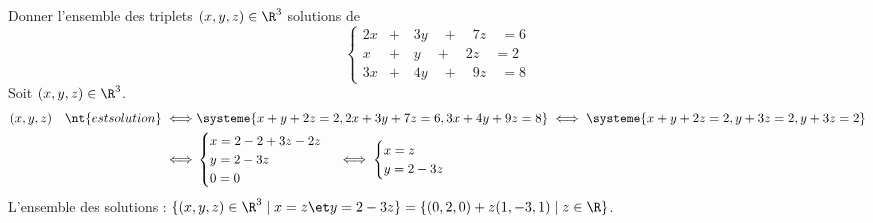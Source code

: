 \documentclass[11pt]{article}
\begin{document}
\begin{ex}{}{}
    Donner l'ensemble des triplets $(x,y,z)\in\R^3$ solutions de
    \begin{equation*}
        \begin{cases}
            2x&+\quad 3y\quad+\quad 7z\quad= 6\\
            x&+\quad y\quad+\quad 2z\quad= 2\\
            3x&+\quad 4y\quad+\quad 9z\quad= 8
        \end{cases}
    \end{equation*}
    \tcblower
    Soit $(x,y,z)\in\R^3$.
    \begin{align*}
        (x,y,z)\quad\nt{est solution} \iff& \systeme{
            x+y+2z=2,
            2x+3y+7z=6,
            3x+4y+9z=8
        } \iff \systeme{
            x+y+2z=2,
            y+3z=2,
            y+3z=2
        }\\ \iff& \begin{cases}
            x=2-2+3z-2z\\
            y=2-3z\\
            0=0
        \end{cases} \iff \begin{cases}
            x=z\\
            y=2-3z
        \end{cases}
    \end{align*}
    L'ensemble des solutions : $\{(x,y,z)\in\R^3\mid x=z\et y=2-3z\}=\{(0,2,0)+z(1,-3,1)\mid z\in\R\}$.
\end{ex}
\end{document}

